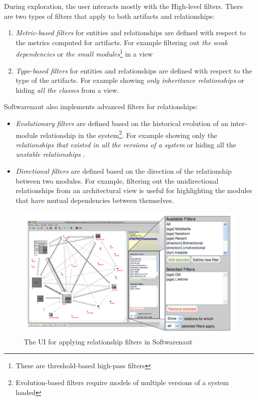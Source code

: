 \documentclass[preprint,12pt]{elsarticle}
\begin{document}
During exploration, the user interacts mostly with the High-level filters. There are two types of filters that apply to both artifacts and relationships: 

\begin{enumerate}

\item {\em Metric-based filters} for entities and relationships are defined with respect to the metrics computed for artifacts. For example filtering out {\em the weak dependencies} or {\em the small modules}\footnote{These are threshold-based high-pass filters} in a view

\item {\em Type-based filters} for entities and relationships are defined with respect to the type of the artifacts. For example showing {\em only inheritance relationships} or hiding {\em all the classes} from a view.

\end{enumerate}

Softwarenaut also implements advanced filters for relationships:

\begin{itemize}

\item {\em Evolutionary filters} are defined based on the historical evolution of an inter-module relationship in the system\footnote{Evolution-based filters require models of multiple versions of a system loaded}. For example showing only the {\em relationships that existed in all the versions of a system} or hiding all the {\em unstable relationships} \cite{lungu-relevo}.

\item {\em Directional filters} are defined based on the direction of the relationship between two modules. For example, filtering out the unidirectional relationships from an architectural view is useful for highlighting the modules that have mutual dependencies between themselves. 

\end{itemize}

\begin{figure}[ht]
\begin{center}
\includegraphics[width=\linewidth]{SnautFilteringPanel}
\caption{The UI for applying relationship filters in Softwarenaut}
\end{center}
\end{figure}
\end{document}
